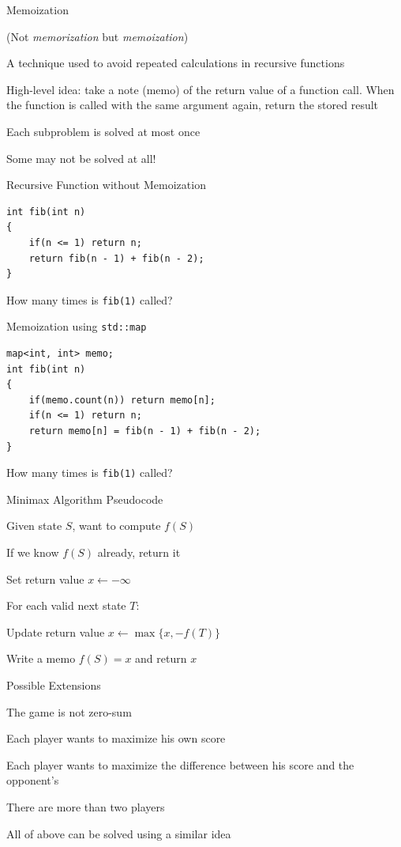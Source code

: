 \documentclass[13pt,onlymath]{beamer}
\begin{document}
\begin{frame}{Memoization}
\BIT
\item (Not \emph{memorization} but \emph{memoization})
\item A technique used to avoid repeated calculations in recursive functions
\item High-level idea: take a note (memo) of the return value of a function call. When the function is called with the same argument again, return the stored result
\item Each subproblem is solved at most once
\BIT
\item Some may not be solved at all!
\EIT
\EIT
\end{frame}

\begin{frame}[fragile]{Recursive Function without Memoization}
\begin{Verbatim}[xleftmargin=25pt]
int fib(int n)
{
    if(n <= 1) return n;
    return fib(n - 1) + fib(n - 2);
}
\end{Verbatim}
\vfill
\BIT
\item How many times is \verb,fib(1), called?
\EIT
\end{frame}

\begin{frame}[fragile]{Memoization using \texttt{std::map}}
\begin{Verbatim}[xleftmargin=25pt]
map<int, int> memo;
int fib(int n)
{
    if(memo.count(n)) return memo[n];
    if(n <= 1) return n;
    return memo[n] = fib(n - 1) + fib(n - 2);
}
\end{Verbatim}
\vfill
\BIT
\item How many times is \verb,fib(1), called?
\EIT
\end{frame}

\begin{frame}{Minimax Algorithm Pseudocode}
\BIT
\item Given state $S$, want to compute $f(S)$
\vfill
\item If we know $f(S)$ already, return it
\item Set return value $x \leftarrow -\infty$
\item For each valid next state $T$:
\BIT
\item Update return value $x \leftarrow \max\{x, -f(T)\}$
\EIT
\item Write a memo $f(S) = x$ and return $x$
\EIT
\end{frame}

\begin{frame}{Possible Extensions}
\BIT
\item The game is not zero-sum
\BIT
\item Each player wants to maximize his own score
\item Each player wants to maximize the difference between his score and the opponent's
\EIT
\item There are more than two players
\vfill
\item All of above can be solved using a similar idea
\EIT
\end{frame}
\end{document}
